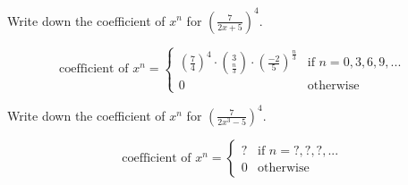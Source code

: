 \nextq
Write down the coefficient of $x^n$ for 
$\displaystyle \left( \frac{7}{2x + 5} \right) ^4$.
\\
\ANSWER
\begin{answerlong}
\[
\text{coefficient of $x^n$}
= 
\begin{cases}
    (\frac{7}{4})^4 \cdot \binom{3}{\frac{n}{3}} \cdot (\frac{-2}{5})^\frac{n}{3} &\text{if $n = 0,3,6,9,...$} \\
0 &\text{otherwise}
\end{cases}
\]
\end{answerlong}

\nextq
Write down the coefficient of $x^n$ for 
$\displaystyle \left( \frac{7}{2x^3 - 5} \right) ^4$.
\\
\ANSWER
\begin{answerlong}
\[
\text{coefficient of $x^n$}
=
\begin{cases}
? &\text{if $n = ?,?,?,...$} \\
0 &\text{otherwise}
\end{cases}
\]
\end{answerlong}

\newpage


